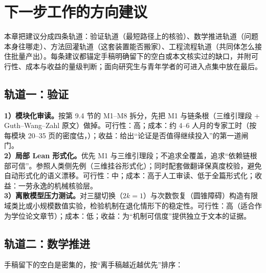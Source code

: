 \section{下一步工作的方向建议}

本章把建议分成四条轨道：验证轨道（最短路径上的核验）、数学推进轨道（问题本身往哪走）、方法回灌轨道（这套装置能否搬家）、工程流程轨道（共同体怎么接住批量产出）。每条建议都锚定手稿明确留下的空白或本文核实过的缺口，并附可行性、成本与收益的量级判断；面向研究生与青年学者的可进入点集中放在最后。

\subsection{轨道一：验证}

\begin{dirbox}[验证轨道]
\textbf{1）模块化审读。}按第 9.4 节的 M1--M8 拆分，先把 M1 与链条根（三维引理段 + Guth--Wang--Zahl 原文）做掉。可行性：高；成本：约 4--6 人月的专家工时（按每模块 20--35 页的密度估，\cfM）；收益：给出“论证是否值得继续投入”的第一道闸门。\\
\textbf{2）局部 Lean 形式化。}优先 M1 与三维引理段；不追求全覆盖，追求“依赖链根部可信”。参照人类侧先例（三维挂谷形式化）；同时配套做翻译保真度校验，避免自动形式化的语义漂移。可行性：中；成本：高于人工审读、低于全篇形式化；收益：一劳永逸的机械核验层。\\
\textbf{3）离散模型压力测试。}对三腿切换（$2k=1$）与次数恢复（圆锥障碍）构造有限域类比或小规模数值实验，检验机制在退化情形下的稳定性。可行性：高（适合作为学位论文章节）；成本：低；收益：为“机制可信度”提供独立于文本的证据。
\end{dirbox}

\subsection{轨道二：数学推进}

手稿留下的空白是密集的，按“离手稿越近越优先”排序：

